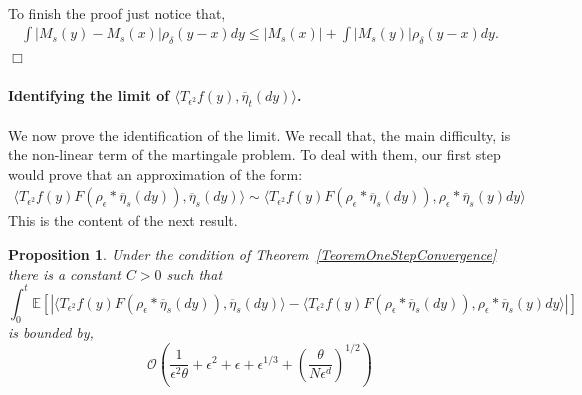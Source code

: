 \documentclass[12pt]{article}
\newenvironment {proof}{{\noindent\bf Proof }}{\hfill $\Box$ \medskip}
\newtheorem{proposition}[theorem]{Proposition}
\newcommand{\IE}{\mathbb E}
\begin{document}
\begin{proof}
\begin{align*}
\end{align*}
To finish the proof just notice that,
\begin{align*}
\int |M_s(y)-M_s(x)| \rho_\delta(y-x)dy \leq |M_s(x)| + \int |M_s(y)| \rho_\delta(y-x)dy.
\end{align*}
\end{proof}

\paragraph{Identifying the limit of $\langle T_{\epsilon^2} f(y), \overline{\eta}_t (dy) \rangle$.}
We now prove the identification of the limit. We recall that, the main difficulty, is the non-linear term of the martingale problem. To deal with them, our first step would prove that an approximation of the form:
\begin{align*}
\langle T_{\epsilon^2} f(y) F(\rho_\epsilon *\overline{\eta}_s(dy)), \overline{\eta}_s(dy) \rangle \sim \langle T_{\epsilon^2} f(y) F(\rho_\epsilon * \overline{\eta}_s(dy)), \rho_\epsilon * \overline{\eta}_s(y) dy \rangle
\end{align*}
This is the content of the next result.
\begin{proposition} \label{CuadraticApprox}
Under the condition of Theorem~\ref{TeoremOneStepConvergence} there is a constant $C>0$ such that
\begin{equation*}
\int_0^t \IE[|\langle T_{\epsilon^2} f(y) F(\rho_\epsilon *\overline{\eta}_s(dy)), \overline{\eta}_s(dy) \rangle - \langle T_{\epsilon^2} f(y) F(\rho_\epsilon * \overline{\eta}_s(dy)), \rho_\epsilon * \overline{\eta}_s(y) dy \rangle|]
\end{equation*}
is bounded by,
\begin{equation*}
\mathcal{O}\left( \frac{1}{\epsilon^2 \theta} + \epsilon^2 + \epsilon + \epsilon^{1/3}  + \left( \frac{\theta}{N \epsilon^d} \right)^{1/2}\right)
\end{equation*}
\end{proposition}
\end{document}
